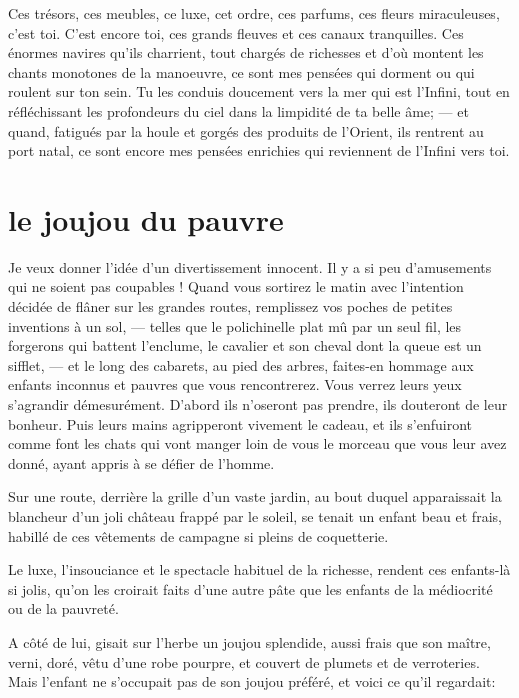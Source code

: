 Ces trésors, ces meubles, ce luxe, cet ordre, ces parfums, ces fleurs
miraculeuses, c’est toi. C’est encore
toi, ces grands fleuves et ces canaux tranquilles. Ces énormes navires
qu’ils charrient, tout chargés de richesses et
d’où montent les chants monotones de la manoeuvre, ce
sont mes pensées qui dorment ou qui roulent sur ton sein. Tu les
conduis doucement vers la mer qui est l’Infini, tout
en réfléchissant les profondeurs du ciel dans la limpidité de ta belle
âme; --- et quand, fatigués par la houle et gorgés des produits de
l’Orient, ils rentrent au port natal, ce sont encore
mes pensées enrichies qui reviennent de l’Infini vers
toi.

\quebra\section[Le joujou du pauvre]{le joujou du pauvre }

Je veux donner l’idée d’un
divertissement innocent. Il y a si peu d’amusements
qui ne soient pas coupables !
Quand vous sortirez le matin avec l’intention décidée
de flâner sur les grandes routes, remplissez vos poches de petites
inventions à un sol, --- telles que le polichinelle plat mû par un seul
fil, les forgerons qui battent l’enclume, le cavalier
et son cheval dont la queue est un sifflet, --- et le long des cabarets,
au pied des arbres, faites{}-en hommage aux enfants inconnus et pauvres
que vous rencontrerez. Vous verrez leurs yeux
s’agrandir démesurément. D’abord ils
n’oseront pas prendre, ils douteront de leur bonheur.
Puis leurs mains agripperont vivement le cadeau, et ils
s’enfuiront comme font les chats qui vont manger loin
de vous le morceau que vous leur avez donné, ayant appris à se défier
de l’homme.

Sur une route, derrière la grille d’un vaste jardin, au
bout duquel apparaissait la blancheur d’un joli
château frappé par le soleil, se tenait un enfant beau et frais,
habillé de ces vêtements de campagne si pleins de coquetterie.

Le luxe, l’insouciance et le spectacle habituel de la
richesse, rendent ces enfants{}-là si jolis, qu’on les
croirait faits d’une autre pâte que les enfants de la
médiocrité ou de la pauvreté.

A côté de lui, gisait sur l’herbe un joujou splendide,
aussi frais que son maître, verni, doré, vêtu d’une
robe pourpre, et couvert de plumets et de verroteries. Mais
l’enfant ne s’occupait pas de son
joujou préféré, et voici ce qu’il regardait:

